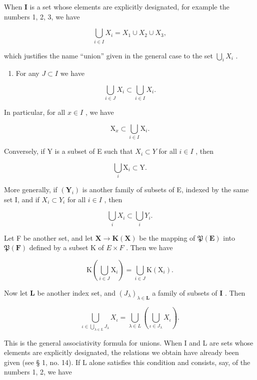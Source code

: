 When \(\mathbf{I}\) is a set whose elements are explicitly designated, for example the numbers 1, 2, 3, we have

\[
\bigcup_ {i \in I} X _ {i} = X _ {1} \cup X _ {2} \cup X _ {3},
\]

which justifies the name ``union'' given in the general case to the set \(\bigcup_{i}X_{i}\) .

\begin{enumerate}
\def\labelenumi{\arabic{enumi}.}
\setcounter{enumi}{2}
\tightlist
\item
  For any \(J \subset I\) we have
\end{enumerate}

\[
\bigcup_ {i \in J} X _ {i} \subset \bigcup_ {i \in I} X _ {i}.
\]

In particular, for all \(x \in I\) , we have

\[
\mathrm{X} _ {x} \subset \bigcup_ {i \in I} \mathrm{X} _ {i}.
\]

Conversely, if Y is a subset of E such that \(X_{i} \subset Y\) for all \(i \in I\) , then

\[
\bigcup_ {i} \mathrm{X} _ {i} \subset \mathrm{Y}.
\]

More generally, if \((\mathbf{Y}_{i})\) is another family of subsets of E, indexed by the same set I, and if \(X_{i} \subset Y_{i}\) for all \(i \in I\) , then

\[
\bigcup_ {i} X _ {i} \subset \bigcup_ {i} Y _ {i}.
\]

Let F be another set, and let \(\mathbf{X} \to \mathbf{K}(\mathbf{X})\) be the mapping of \(\mathfrak{P}(\mathbf{E})\) into \(\mathfrak{P}(\mathbf{F})\) defined by a subset K of \(E \times F\) . Then we have

\[
\mathrm{K} \left(\bigcup_ {i \in J} \mathrm{X} _ {i}\right) = \bigcup_ {i \in J} \mathrm{K} (\mathrm{X} _ {i}).\tag{34}
\]

Now let \(\mathbf{L}\) be another index set, and \((J_{\lambda})_{\lambda \in \mathbf{L}}\) a family of subsets of \(\mathbf{I}\) . Then

\[
\bigcup_ {\iota \in \bigcup_ {\lambda \in L} J _ {\lambda}} X _ {\iota} = \bigcup_ {\lambda \in L} \left(\bigcup_ {\iota \in J _ {\lambda}} X _ {\iota}\right).\tag{35}
\]

This is the general associativity formula for unions. When I and L are sets whose elements are explicitly designated, the relations we obtain have already been given (see § 1, no. 14). If L alone satisfies this condition and consists, say, of the numbers 1, 2, we have

